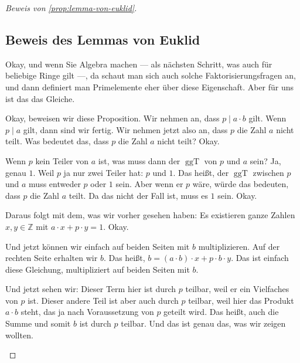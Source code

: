 \begin{proof}[Beweis von \cref{prop:lemma-von-euklid}]

\subsection{Beweis des Lemmas von Euklid}

\begin{spoken-clean}[00:43:14 - 00:46:03]
Okay, und wenn Sie Algebra machen --- als nächsten Schritt, was auch für beliebige Ringe gilt ---, da schaut man sich auch solche Faktorisierungsfragen an, und dann definiert man Primelemente eher über diese Eigenschaft. Aber für uns ist das das Gleiche.

Okay, beweisen wir diese Proposition. Wir nehmen an, dass $p \mid a \cdot b$ gilt. Wenn $p \mid a$ gilt, dann sind wir fertig. Wir nehmen jetzt also an, dass $p$ die Zahl $a$ nicht teilt. Was bedeutet das, dass $p$ die Zahl $a$ nicht teilt? Okay.

Wenn $p$ kein Teiler von $a$ ist, was muss dann der $\operatorname{ggT}$ von $p$ und $a$ sein? Ja, genau $1$. Weil $p$ ja nur zwei Teiler hat: $p$ und $1$. Das heißt, der $\operatorname{ggT}$ zwischen $p$ und $a$ muss entweder $p$ oder $1$ sein. Aber wenn er $p$ wäre, würde das bedeuten, dass $p$ die Zahl $a$ teilt. Da das nicht der Fall ist, muss es $1$ sein. Okay.

Daraus folgt mit dem, was wir vorher gesehen haben: Es existieren ganze Zahlen $x, y \in \mathbb{Z}$ mit $a \cdot x + p \cdot y = 1$. Okay.

Und jetzt können wir einfach auf beiden Seiten mit $b$ multiplizieren. Auf der rechten Seite erhalten wir $b$. Das heißt, $b = (a \cdot b) \cdot x + p \cdot b \cdot y$. Das ist einfach diese Gleichung, multipliziert auf beiden Seiten mit $b$.

Und jetzt sehen wir: Dieser Term hier ist durch $p$ teilbar, weil er ein Vielfaches von $p$ ist. Dieser andere Teil ist aber auch durch $p$ teilbar, weil hier das Produkt $a \cdot b$ steht, das ja nach Voraussetzung von $p$ geteilt wird. Das heißt, auch die Summe und somit $b$ ist durch $p$ teilbar. Und das ist genau das, was wir zeigen wollten.
\end{spoken-clean}

\begin{math-stroke}
\begin{ai-proof-skeleton-invisible-content}
\end{ai-proof-skeleton-invisible-content}


\end{math-stroke}
\end{proof}
